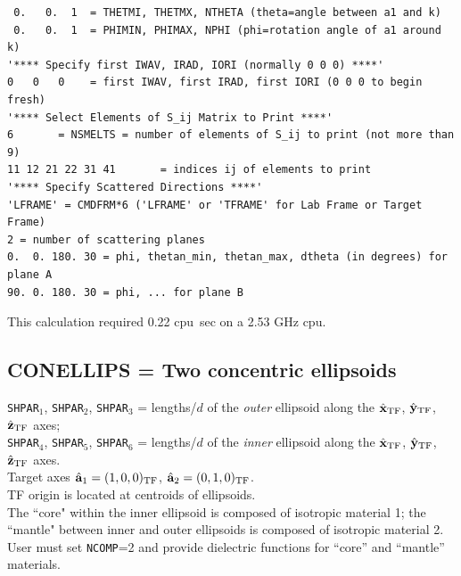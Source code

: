 {\begin{verbatim}
 0.   0.  1  = THETMI, THETMX, NTHETA (theta=angle between a1 and k)
 0.   0.  1  = PHIMIN, PHIMAX, NPHI (phi=rotation angle of a1 around k)
'**** Specify first IWAV, IRAD, IORI (normally 0 0 0) ****'
0   0   0    = first IWAV, first IRAD, first IORI (0 0 0 to begin fresh)
'**** Select Elements of S_ij Matrix to Print ****'
6       = NSMELTS = number of elements of S_ij to print (not more than 9)
11 12 21 22 31 41       = indices ij of elements to print
'**** Specify Scattered Directions ****'
'LFRAME' = CMDFRM*6 ('LFRAME' or 'TFRAME' for Lab Frame or Target Frame)
2 = number of scattering planes
0.  0. 180. 30 = phi, thetan_min, thetan_max, dtheta (in degrees) for plane A
90. 0. 180. 30 = phi, ... for plane B
\end{verbatim}
}
This calculation required 0.22 cpu~sec on a 2.53 GHz cpu.
\subsection{ CONELLIPS = Two concentric ellipsoids
            \label{sec:CONELLIPS}}
	{\tt SHPAR$_1$}, {\tt SHPAR$_2$},
	{\tt SHPAR}$_3$ = lengths/$d$ of the {\it outer} ellipsoid
        along the $\hat{\bf x}_{\rm TF}$, $\hat{\bf y}_{\rm TF}$, $\hat{\bf z}_{\rm TF}$ axes;\\
	{\tt SHPAR}$_4$, {\tt SHPAR}$_5$, {\tt SHPAR}$_6$ 
	= lengths/$d$ of the
	{\it inner} ellipsoid along the $\hat{\bf x}_{\rm TF}$, $\hat{\bf y}_{\rm TF}$, $\hat{\bf z}_{\rm TF}$ axes.\\
	Target axes ${\hat{\bf a}}_1=(1,0,0)_{\rm TF}$, 
                    ${\hat{\bf a}}_2=(0,1,0)_{\rm TF}$.\\
	TF origin is located at centroids of ellipsoids.\\
	The ``core" within the inner ellipsoid is composed of isotropic 
	material 1; 
	the ``mantle" between inner and outer
	ellipsoids is composed of isotropic material 2.\\
	User must set {\tt NCOMP}=2 and provide dielectric functions for 
	``core'' and ``mantle'' materials.
